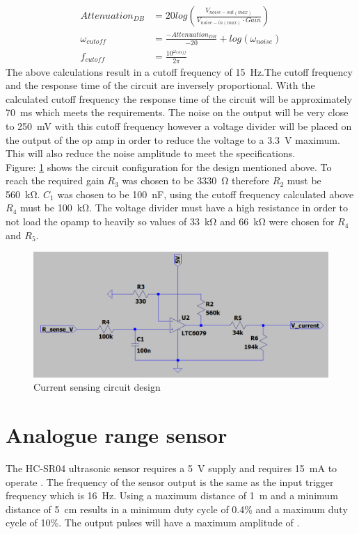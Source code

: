 \begin{align*}
Attenuation_{DB} & = 20 log \left( \frac{V_{noise-out(max)}}{V_{noise-in(max)} \cdot Gain} \right) \\
\omega_{cutoff} & = \frac{-Attenuation_{DB}}{-20} + log(\omega_{noise})\\
f_{cutoff} & = \frac{10^{\omega_{cutoff}}}{2 \pi}
\end{align*}
The above calculations result in a cutoff frequency of \SI{15}{\hertz}.The cutoff frequency and the response time of the circuit are inversely proportional. With the calculated cutoff frequency the response time of the circuit will be approximately \SI{70}{\milli\second} which meets the requirements. The noise on the output will be very close to \SI{250}{\milli\volt} with this cutoff frequency however a voltage divider will be placed on the output of the op amp in order to reduce the voltage to a \SI{3.3}{\volt} maximum. This will also reduce the noise amplitude to meet the specifications.\\

Figure: \ref{fig:cursen_sim_cir} shows the circuit configuration for the design mentioned above. To reach the required gain $R_3$ was chosen to be \SI{3330}{\ohm} therefore $R_2$ must be \SI{560}{\kilo\ohm}. $C_1$ was chosen to be \SI{100}{\nano\farad}, using the cutoff frequency calculated above $R_4$ must be \SI{100}{\kilo\ohm}. The voltage divider must have a high resistance in order to not load the opamp to heavily so values of \SI{33}{\kilo\ohm} and \SI{66}{\kilo\ohm} were chosen for $R_4$ and $R_5$.

\begin{figure}[H]
\centering
\includegraphics[width=0.65\linewidth]{./Figures/CurSens_SimCir.png}
\caption{Current sensing circuit design}
\label{fig:cursen_sim_cir}
\end{figure}

\newpage
\section{Analogue range sensor}
The HC-SR04 ultrasonic sensor requires a \SI{5}{\volt} supply and requires \SI{15}{\milli\ampere} to operate \cite{Design_SonicSens}. The frequency of the sensor output is the same as the input trigger frequency which is \SI{16}{\hertz}. Using a maximum distance of \SI{1}{\meter} and a minimum distance of \SI{5}{\centi\meter} results in a minimum duty cycle of 0.4\% and a maximum duty cycle of 10\%. The output pulses will have a maximum amplitude of  \cite{Design_SonicSens}.

